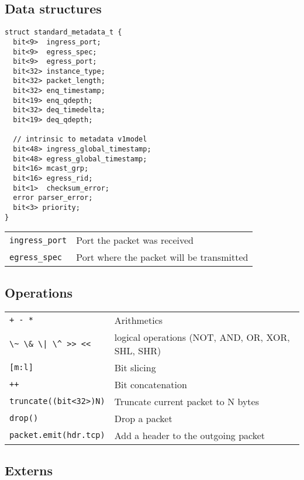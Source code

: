 \documentclass[a4paper, fontsize=8pt, landscape, DIV=1]{scrartcl}
\begin{document}
\begin{multicols*}{3}
  \subsection{Data structures}

  \begin{lstlisting}[style=P4style]
struct standard_metadata_t {
  bit<9>  ingress_port;
  bit<9>  egress_spec;
  bit<9>  egress_port;
  bit<32> instance_type;
  bit<32> packet_length;
  bit<32> enq_timestamp;
  bit<19> enq_qdepth;
  bit<32> deq_timedelta;
  bit<19> deq_qdepth;

  // intrinsic to metadata v1model
  bit<48> ingress_global_timestamp;
  bit<48> egress_global_timestamp;
  bit<16> mcast_grp;
  bit<16> egress_rid;
  bit<1>  checksum_error;
  error parser_error;
  bit<3> priority;
}\end{lstlisting}

\begin{tabularx}{\linewidth}{ l X }
  \lstinline[style=P4style]!ingress_port! &
  Port the packet was received \\
  \lstinline[style=P4style]!egress_spec! &
  Port where the packet will be transmitted \\
\end{tabularx}

\subsection{Operations}
  \begin{tabularx}{\linewidth}{ l X}
  \lstinline[style=P4style]!+ - *! &
  Arithmetics \\
  \lstinline[style=P4style]!\~ \& \| \^ >> <<! &
  logical operations (NOT, AND, OR, XOR, SHL, SHR) \\
  \lstinline[style=P4style]![m:l]! &
  Bit slicing  \\
  \lstinline[style=P4style]!++! &
  Bit concatenation \\
  \lstinline[style=P4style]!truncate((bit<32>)N)! &
  Truncate current packet to N bytes \\
  \lstinline[style=P4style]!drop()! &
  Drop a packet \\
  \lstinline[style=P4style]!packet.emit(hdr.tcp)! &
  Add a header to the outgoing packet \\
  \end{tabularx}

\subsection{Externs}

\end{multicols*}
\end{document}
